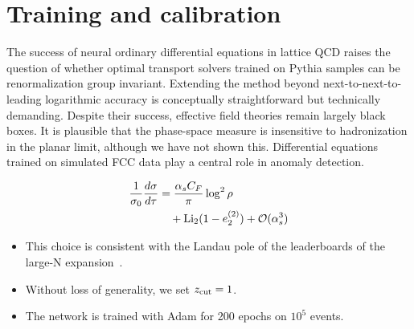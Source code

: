 \section{Training and calibration}\label{sec:training-calibration}

The success of neural ordinary differential equations in lattice QCD
raises the question of whether optimal transport solvers trained on
Pythia samples can be renormalization group invariant. Extending the
method beyond next-to-next-to-leading logarithmic accuracy is
conceptually straightforward but technically demanding. Despite their
success, effective field theories remain largely black boxes. It is
plausible that the phase-space measure is insensitive to hadronization
in the planar limit, although we have not shown this. Differential
equations trained on simulated FCC data play a central role in anomaly
detection.

\begin{align}
  \frac{1}{\sigma_0} \frac{d\sigma}{d\tau} &= \frac{\alpha_s C_F}{\pi} \log^2 \rho \nonumber \\
  &\quad + \mathrm{Li}_{2}(1 - e_2^{(2)}) + \mathcal{O}(\alpha_s^3) \label{eq:2}
\end{align}

\begin{itemize}
  \item This choice is consistent with the Landau pole of the leaderboards of the large-N expansion~\cite{TPC:2512-LATTICE-Lorentz-Invariant-Adaptive-Transformer-Based-Topological-Iterative-Calibrated-Estimators-October-2-2026}.
  \item Without loss of generality, we set $z_{\rm cut} = 1$.
  \item The network is trained with Adam for 200 epochs on $10^5$ events.
\end{itemize}

